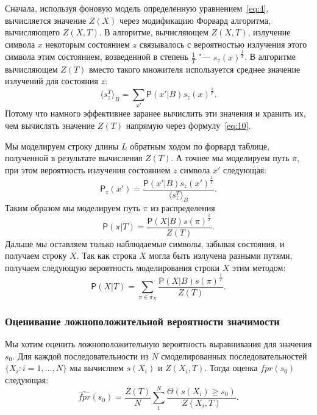 \documentclass[specialist,
substylefile = spbu_report.rtx,
subf,href,colorlinks=true, 12pt]{disser}
\begin{document}
				Сначала, используя фоновую модель определенную уравнением~\eqref{eq:4}, вычисляется значение $Z(X)$ через модификацию Форвард алгоритма, вычисляющего $Z(X,T)$. В алгоритме, вычисляющем $Z(X,T)$, излучение символа $x$ некоторым состоянием $z$ связывалось с вероятностью излучения этого символа этим состоянием, возведенной в степень $\frac{1}{T}$ "--- $s_{z}(x)^{\frac{1}{T}}$. В алгоритме вычисляющем $Z(T)$ вместо такого множителя используется среднее значение излучений для состояния $z$:
				\begin{equation*}
					\langle s_{z}^{T} \rangle_{B} = \sum_{x'}\mathsf{P}(x'|B)s_{z}(x)^{\frac{1}{T}}. \label{eq:12}
				\end{equation*}					
				Потому что намного эффективнее заранее вычислить эти значения и хранить их, чем вычислять значение $Z(T)$ напрямую через формулу~\eqref{eq:10}.
				
				Мы моделируем строку длины $L$ обратным ходом по форвард таблице, полученной в результате вычисления $Z(T)$. А точнее мы моделируем путь $\pi$, при этом вероятность излучения состоянием $z$ символа $x'$ следующая:
				\begin{equation*}
					\mathsf{P}_{z}(x') = \frac{\mathsf{P}(x'|B)s_{z}(x')^{\frac{1}{T}}} {\langle s_{z}^{T} \rangle_{B}}. \label{eq:13}
				\end{equation*}			
				Таким образом мы моделируем путь $\pi$ из распределения 
				\begin{equation*}
					\mathsf{P}(\pi|T) = \frac{\mathsf{P}(X|B)s(\pi)^{\frac{1}{T}}}{Z(T)}. \label{eq:14}
				\end{equation*}
				Дальше мы оставляем только наблюдаемые символы, забывая состояния, и получаем строку $X$. Так как строка $X$ могла быть излучена разными путями, получаем следующую вероятность моделирования строки $X$ этим методом:
				\begin{equation*}				
					\mathsf{P}(X|T) = \sum_{\pi \in \pi_{X}} \frac{\mathsf{P}(X|B)s(\pi)^{\frac{1}{T}}}{Z(T)}. \label{eq:15}
				\end{equation*}	
			
			\subsubsection{Оценивание ложноположительной вероятности значимости}			
				Мы хотим оценить ложноположительную вероятность выравнивания для значения $s_{0}$. Для каждой последовательности из $N$ смоделированных последовательностей $\{X_{i}:i=1,\dots,N\}$ мы вычисляем $s(X_{i})$ и $Z(X_{i}, T)$. Тогда оценка $fpr(s_{0})$ следующая:
				\begin{equation*}	
					\widehat{fpr}(s_{0}) = \frac{Z(T)}{N} \sum_{1}^{N} \frac{\Theta(s(X_{i}) \geq s_{0})}{Z(X_{i}, T)}.
				\end{equation*}							
			
\end{document}
